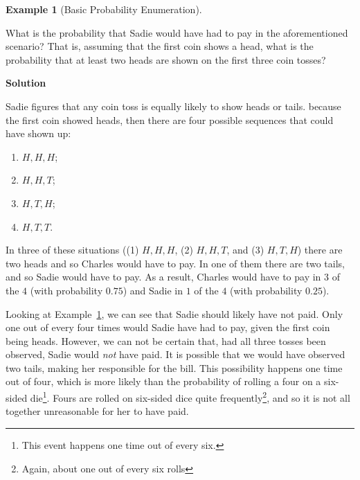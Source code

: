 \documentclass[
  letterpaper,
  DIV=11,
  numbers=noendperiod]{scrreprt}
\providecommand{\tightlist}{%
  \setlength{\itemsep}{0pt}\setlength{\parskip}{0pt}}\usepackage{longtable,booktabs,array}
\theoremstyle{definition}
\theoremstyle{definition}
\theoremstyle{definition}
\newtheorem{example}{Example}[chapter]
\theoremstyle{remark}
\begin{document}
\begin{example}[Basic Probability
Enumeration]\protect\hypertarget{exm-basic-prob}{}\label{exm-basic-prob}

What is the probability that Sadie would have had to pay in the
aforementioned scenario? That is, assuming that the first coin shows a
head, what is the probability that at least two heads are shown on the
first three coin tosses?

\begin{tcolorbox}[enhanced jigsaw, colback=white, breakable, rightrule=.15mm, leftrule=.75mm, toprule=.15mm, left=2mm, arc=.35mm, opacityback=0, bottomrule=.15mm]

\vspace{-3mm}\textbf{Solution}\vspace{3mm}

Sadie figures that any coin toss is equally likely to show heads or
tails. because the first coin showed heads, then there are four possible
sequences that could have shown up:

\begin{enumerate}
\def\labelenumi{\arabic{enumi}.}
\tightlist
\item
  \(H,H,H\);
\item
  \(H,H,T\);
\item
  \(H,T,H\);
\item
  \(H,T,T\).
\end{enumerate}

In three of these situations ((1) \(H,H,H\), (2) \(H,H,T\), and (3)
\(H,T,H\)) there are two heads and so Charles would have to pay. In one
of them there are two tails, and so Sadie would have to pay. As a
result, Charles would have to pay in \(3\) of the \(4\) (with
probability \(0.75\)) and Sadie in \(1\) of the \(4\) (with probability
\(0.25\)).

\end{tcolorbox}

\end{example}

Looking at Example~\ref{exm-basic-prob}, we can see that Sadie should
likely have not paid. Only one out of every four times would Sadie have
had to pay, given the first coin being heads. However, we can not be
certain that, had all three tosses been observed, Sadie would \emph{not}
have paid. It is possible that we would have observed two tails, making
her responsible for the bill. This possibility happens one time out of
four, which is more likely than the probability of rolling a four on a
six-sided die\footnote{This event happens one time out of every six.}.
Fours are rolled on six-sided dice quite frequently\footnote{Again,
  about one out of every six rolls}, and so it is not all together
unreasonable for her to have paid.
\end{document}
